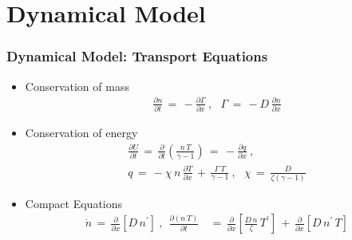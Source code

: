 \documentclass[10pt]{beamer}
\begin{document}
\section{Dynamical Model}
\begin{frame} %
\frametitle{Dynamical Model: Transport Equations}
\begin{itemize}
	\item Conservation of mass
\begin{align} %
	\frac{\partial n}{\partial t} \,=\, -\frac{\partial \Gamma}{\partial x}~,
		~~~ \Gamma \,=\, -D \, \frac{\partial n}{\partial x}
		\label{eq:n_continuity}
\end{align}
	\item Conservation of energy
\begin{align} %
	\frac{\partial U}{\partial t} \,=\, \frac{\partial}{\partial t}
		\left(\frac{n\,T}{\gamma - 1}\right) \,=\,
		-\frac{\partial q}{\partial x}~, \label{eq:U_continuity} \\
	q \,=\, -\chi \, n \, \frac{\partial T}{\partial x} \,+\,
	\frac{\Gamma \, T}{\gamma - 1}~,~~~ \chi \,=\, \frac{D}{\zeta (\gamma - 1)}
\end{align}
	\item Compact Equations
\begin{align} %
	\dot{n} \,=\, \frac{\partial}{\partial x} \left[D \, n^\prime\right]~,~~
	\frac{\partial(n\,T)}{\partial t} \,&=\, \frac{\partial}{\partial x}
		\left[\frac{D\,n}{\zeta} \, T^\prime\right]
		\,+\, \frac{\partial}{\partial x} \left[D\, n^\prime \, T \right]
		\label{eq:U_compact}
\end{align}
\end{itemize}
\end{frame}

\end{document}
